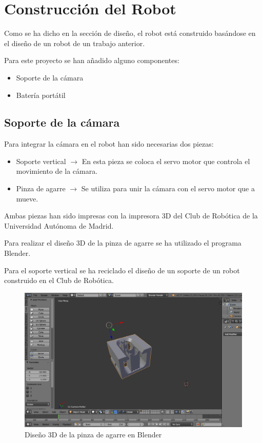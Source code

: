 \documentclass[twoside, 12pt]{epstfg}
\begin{document}
\section{Construcción del Robot}
Como se ha dicho en la sección de diseño, el robot está construido basándose en el diseño de un robot de un trabajo anterior.

Para este proyecto se han añadido alguno componentes:

\begin{itemize}
	\item Soporte de la cámara
	\item Batería portátil
\end{itemize}

\subsection{Soporte de la cámara}

Para integrar la cámara en el robot han sido necesarias dos piezas:

\begin{itemize}
	\item Soporte vertical $\rightarrow$ En esta pieza se coloca el servo motor que controla el movimiento de la cámara.
	
	\item Pinza de agarre $\rightarrow$ Se utiliza para unir la cámara con el servo motor que a mueve.
\end{itemize}

Ambas piezas han sido impresas con la impresora 3D del Club de Robótica de la Universidad Autónoma de Madrid.

Para realizar el diseño 3D de la pinza de agarre se ha utilizado el programa Blender.

Para el soporte vertical se ha reciclado el diseño de un soporte de un robot construido en el Club de Robótica.

\begin{figure}[h]
	\centerline{
		\mbox{\includegraphics[width=.80\textwidth]{images/cameraBlender.png}}
	}
	\caption{ Diseño 3D de la pinza de agarre en Blender}
\end{figure}
\end{document}

